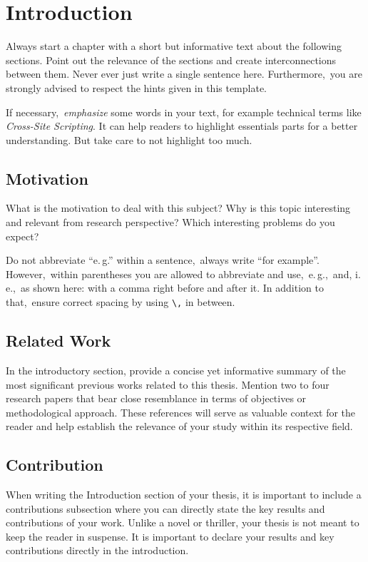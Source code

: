 \chapter{Introduction} \label{chap:intro}
Always start a chapter with a short but informative text about the following sections. Point out the relevance of the sections and create interconnections between them. Never ever just write a single sentence here. Furthermore,\ you are strongly advised to respect the hints given in this template.

If necessary,\ \emph{emphasize} some words in your text, for example technical terms like \emph{Cross-Site Scripting}.
It can help readers to highlight essentials parts for a better understanding.
But take care to not highlight too much.

\section{Motivation}
What is the motivation to deal with this subject?
Why is this topic interesting and relevant from research perspective?
Which interesting problems do you expect?

Do not abbreviate \enquote{e.\,g.\/} within a sentence,\ always write \enquote{for example}. However,\ within parentheses you are allowed to abbreviate and use,\ e.\,g.,\ and, i.\,e.,\ as shown here: with a comma right before and after it. In addition to that,\ ensure correct spacing by using \texttt{\textbackslash,} in between.

\section{Related Work}

In the introductory section, provide a concise yet informative summary of the most significant previous works related to this thesis. Mention two to four research papers that bear close resemblance in terms of objectives or methodological approach. These references will serve as valuable context for the reader and help establish the relevance of your study within its respective field.

\section{Contribution}
\label{sec:Contribution}

When writing the Introduction section of your thesis, it is important to include a contributions subsection where you can directly state the key results and contributions of your work. Unlike a novel or thriller, your thesis is not meant to keep the reader in suspense. It is important to declare your results and key contributions directly in the introduction.


